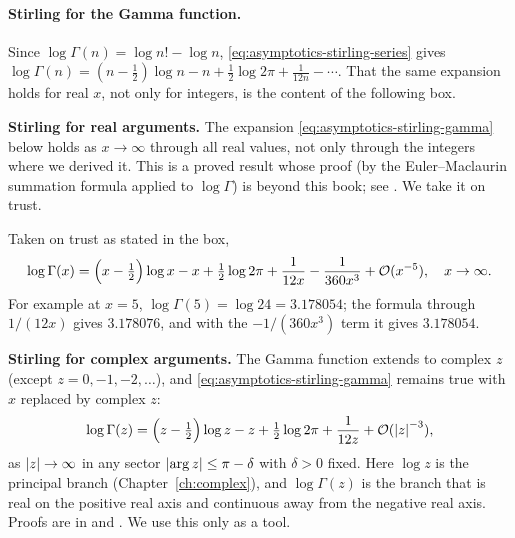 \paragraph{Stirling for the Gamma function.} Since $\log\Gamma(n)=\log n!-\log n$, \cref{eq:asymptotics-stirling-series} gives $\log\Gamma(n)=(n-\tfrac12)\log n-n+\tfrac12\log2\pi+\tfrac1{12n}-\cdots$. That the same expansion holds for real $x$, not only for integers, is the content of the following box.
\begin{beyond}
\textbf{Stirling for real arguments.} The expansion \cref{eq:asymptotics-stirling-gamma} below holds as $x\to\infty$ through all real values, not only through the integers where we derived it. This is a proved result whose proof (by the Euler--Maclaurin summation formula applied to $\log\Gamma$) is beyond this book; see \cite{rhb}. We take it on trust.
\end{beyond}
\noindent Taken on trust as stated in the box,
\begin{equation}
\log\Gamma(x)=\Bigl(x-\tfrac12\Bigr)\log x-x+\tfrac12\log2\pi+\frac{1}{12x}-\frac{1}{360x^3}+\mathcal{O}(x^{-5}),\quad x\to\infty .
\label{eq:asymptotics-stirling-gamma}
\end{equation}
For example at $x=5$, $\log\Gamma(5)=\log24=3.178054$; the formula through $1/(12x)$ gives $3.178076$, and with the $-1/(360x^3)$ term it gives $3.178054$.

\begin{beyond}
\textbf{Stirling for complex arguments.} The Gamma function extends to complex $z$ (except $z=0,-1,-2,\dots$), and \cref{eq:asymptotics-stirling-gamma} remains true with $x$ replaced by complex $z$:
\[
\log\Gamma(z)=\Bigl(z-\tfrac12\Bigr)\log z-z+\tfrac12\log2\pi+\frac{1}{12z}+\mathcal{O}(\left\lvert z\right\rvert^{-3}),
\]
as $\left\lvert z\right\rvert\to\infty$ in any sector $\left\lvert \arg z\right\rvert\le\pi-\delta$ with $\delta>0$ fixed. Here $\log z$ is the principal branch (Chapter~\ref{ch:complex}), and $\log\Gamma(z)$ is the branch that is real on the positive real axis and continuous away from the negative real axis. Proofs are in \cite{edwards} and \cite{titchmarsh}. We use this only as a tool.
\end{beyond}

